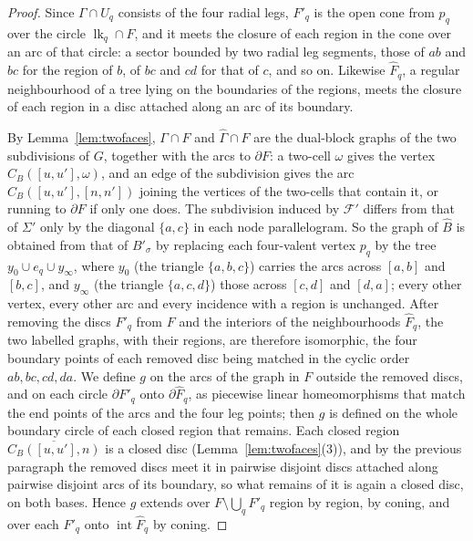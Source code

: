 \begin{proof}
Since $\Gamma\cap U_q$ consists of the four radial legs, $F'_q$ is the open cone from $p_q$ over the circle
$\operatorname{lk}_q\cap F$, and it meets the closure of each region in the cone over an arc of that circle: a sector bounded by
two radial leg segments, those of $ab$ and $bc$ for the region of $b$, of $bc$ and $cd$ for that of $c$, and so on. Likewise
$\widehat F_q$, a regular neighbourhood of a tree lying on the boundaries of the regions, meets the closure of each region in a
disc attached along an arc of its boundary.

By Lemma~\ref{lem:twofaces}, $\Gamma\cap F$ and $\widehat\Gamma\cap F$ are the dual-block graphs of the two subdivisions of
$G$, together with the arcs to $\partial F$: a two-cell $\omega$ gives the vertex $C_B([u,u'],\omega)$, and an edge of the
subdivision gives the arc $C_B([u,u'],[n,n'])$ joining the vertices of the two-cells that contain it, or running to $\partial F$
if only one does. The subdivision induced by $\mathcal F'$ differs from that of $\Sigma'$ only by the diagonal $\{a,c\}$ in each
node parallelogram. So the graph of $\widehat B$ is obtained from that of $B'_\sigma$ by replacing each four-valent vertex
$p_q$ by the tree $y_0\cup e_q\cup y_\infty$, where $y_0$ (the triangle $\{a,b,c\}$) carries the arcs across $[a,b]$ and
$[b,c]$, and $y_\infty$ (the triangle $\{a,c,d\}$) those across $[c,d]$ and $[d,a]$; every other vertex, every other arc and
every incidence with a region is unchanged. After removing the discs $F'_q$ from $F$ and the interiors of the
neighbourhoods $\widehat F_q$, the two labelled graphs, with their regions, are therefore isomorphic, the four boundary points
of each removed disc being matched in the cyclic order $ab,bc,cd,da$. We define $g$ on the arcs of the graph in $F$ outside the
removed discs, and on each circle $\partial F'_q$ onto $\partial\widehat F_q$, as piecewise linear homeomorphisms that match
the end points of the arcs and the four leg points; then $g$ is defined on the whole boundary circle of each closed region
that remains. Each closed region $\overline{C_B([u,u'],n)}$ is a closed disc
(Lemma~\ref{lem:twofaces}(3)), and by the previous paragraph the removed discs meet it in pairwise disjoint discs attached
along pairwise disjoint arcs of its boundary, so what remains of it is again a closed disc, on both bases. Hence $g$ extends over $F\setminus\bigcup_qF'_q$ region by region, by
coning, and over each $F'_q$ onto $\operatorname{int}\widehat F_q$ by coning.


\end{proof}
